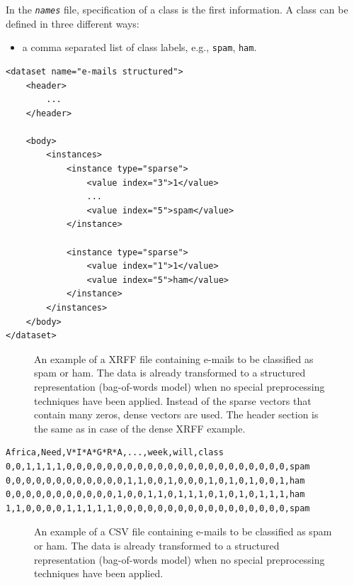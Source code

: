 In the \textit{\texttt{names}} file, specification of a class is the first information. A class can
be defined in three different ways:

\begin{itemize}
    \item a comma separated list of class labels, e.g., \texttt{spam}, \texttt{ham}.
\end{itemize}

\begin{verbatim}
<dataset name="e-mails structured">
    <header>
        ...
    </header>

    <body>
        <instances>
            <instance type="sparse">
                <value index="3">1</value>
                ...
                <value index="5">spam</value>
            </instance>

            <instance type="sparse">
                <value index="1">1</value>
                <value index="5">ham</value>
            </instance>
        </instances>
    </body>
</dataset>
\end{verbatim}

\begin{figure}[H]
    \centering
    \caption{An example of a XRFF file containing e-mails to be classified as spam or ham.
The data is already transformed to a structured representation (bag-of-words model) when no
special preprocessing techniques have been applied. Instead of the sparse vectors that contain
many zeros, dense vectors are used. The header section is the same as in case of the dense
XRFF example.}
    \label{fig:placeholder313}
\end{figure}

\begin{verbatim}
Africa,Need,V*I*A*G*R*A,...,week,will,class
0,0,1,1,1,1,0,0,0,0,0,0,0,0,0,0,0,0,0,0,0,0,0,0,0,0,0,0,spam
0,0,0,0,0,0,0,0,0,0,0,0,1,1,0,0,1,0,0,0,1,0,1,0,1,0,0,1,ham
0,0,0,0,0,0,0,0,0,0,0,1,0,0,1,1,0,1,1,1,0,1,0,1,0,1,1,1,ham
1,1,0,0,0,0,1,1,1,1,1,0,0,0,0,0,0,0,0,0,0,0,0,0,0,0,0,0,spam
\end{verbatim}

\begin{figure}[H]
    \centering
    \caption{An example of a CSV file containing e-mails to be classified as spam or ham.
The data is already transformed to a structured representation (bag-of-words model) when no
special preprocessing techniques have been applied.}
    \label{fig:placeholder314}
\end{figure}


